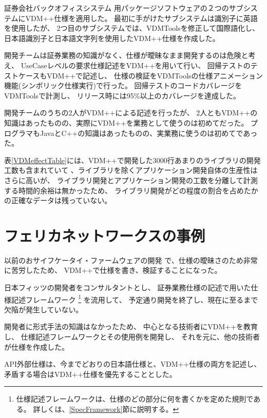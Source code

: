 証券会社バックオフィスシステム
用パッケージソフトウェアの２つのサブシステムにVDM++仕様を適用した。
最初に手がけたサブシステムは識別子に英語を使用したが、
2つ目のサブシステムでは、VDMToolsを修正して国際語化し、日本語識別子と日本語文字列を使用したVDM++仕様を作成した。

開発チームは証券業務の知識がなく、仕様が曖昧なまま開発するのは危険と考え、
UseCaseレベルの要求仕様記述をVDM++を用いて行い、
回帰テストのテストケースもVDM++で記述し、
仕様の検証をVDMToolsの仕様アニメーション機能(シンボリック仕様実行)で行った。
回帰テストのコードカバレージをVDMToolsで計測し、
リリース時には95\%以上のカバレージを達成した。

開発チームのうちの2人がVDM++による記述を行ったが、
2人ともVDM++の知識はあったものの、実際にVDM++を業務として使うのは初めてだった。
プログラマもJavaとC++の知識はあったものの、実業務に使うのは初めてであった。

表\ref{VDMeffectTable}には、VDM++で開発した3000行あまりのライブラリの開発工数も含まれていて
、ライブラリを除くアプリケーション開発自体の生産性はさらに高いが、
ライブラリ開発とアプリケーション開発の工数を分離して計測する時間的余裕は無かったため、
ライブラリ開発がどの程度の割合を占めたかの正確なデータは残っていない。

\section{フェリカネットワークスの事例}
	\label{FeliCa}

以前のおサイフケータイ・ファームウェアの開発
で、仕様の曖昧さのため非常に苦労したため、
VDM++で仕様を書き、検証することになった。

日本フィッツの開発者をコンサルタントとし、
証券業務仕様の記述で用いた仕様記述フレームワーク
	\footnote{仕様記述フレームワークは、仕様のどの部分に何を書くかを定めた規則である。
	詳しくは、\ref{SpecFramework}節に説明する。}
を流用して、
予定通り開発を終了し、現在に至るまで欠陥が発生していない。

開発者に形式手法の知識はなかったため、
中心となる技術者にVDM++を教育し、
仕様記述フレームワークとその使用例を開発し、
それを元に、他の技術者が仕様を作成した。

API外部仕様は、今までどおりの日本語仕様と、VDM++仕様の両方を記述し、
矛盾する場合はVDM++仕様を優先することとした。

